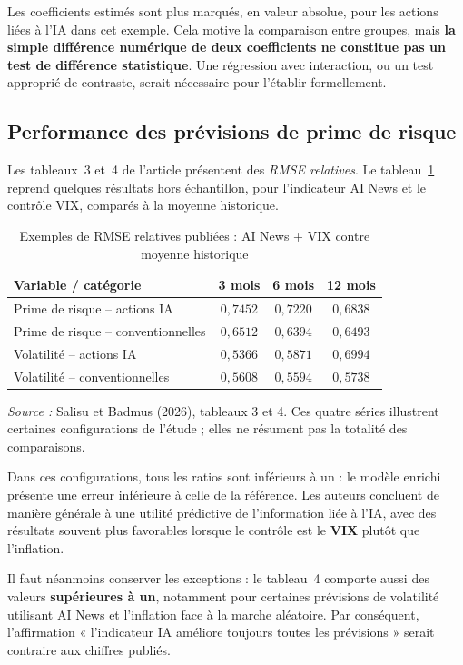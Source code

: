 \documentclass[11pt,a4paper]{article}
\begin{document}
Les coefficients estimés sont plus marqués, en valeur absolue, pour les actions liées à l'IA dans cet exemple. Cela motive la comparaison entre groupes, mais \textbf{la simple différence numérique de deux coefficients ne constitue pas un test de différence statistique}. Une régression avec interaction, ou un test approprié de contraste, serait nécessaire pour l'établir formellement.

\subsection{Performance des prévisions de prime de risque}
Les tableaux~3 et~4 de l'article présentent des \emph{RMSE relatives}. Le tableau~\ref{tab:forecast} reprend quelques résultats hors échantillon, pour l'indicateur AI News et le contrôle VIX, comparés à la moyenne historique.
\begin{table}[H]
\centering\small
\caption{Exemples de RMSE relatives publiées : AI News + VIX contre moyenne historique}
\label{tab:forecast}
\begin{tabularx}{\textwidth}{@{}Xccc@{}}
\toprule
\textbf{Variable / catégorie} & \textbf{3 mois} & \textbf{6 mois} & \textbf{12 mois}\\
\midrule
Prime de risque -- actions IA & $0{,}7452$ & $0{,}7220$ & $0{,}6838$\\
Prime de risque -- conventionnelles & $0{,}6512$ & $0{,}6394$ & $0{,}6493$\\
Volatilité -- actions IA & $0{,}5366$ & $0{,}5871$ & $0{,}6994$\\
Volatilité -- conventionnelles & $0{,}5608$ & $0{,}5594$ & $0{,}5738$\\
\bottomrule
\end{tabularx}
\vspace{0.1cm}
\parbox{\textwidth}{\footnotesize \emph{Source :} Salisu et Badmus (2026), tableaux 3 et 4. Ces quatre séries illustrent certaines configurations de l'étude ; elles ne résument pas la totalité des comparaisons.}
\end{table}

Dans ces configurations, tous les ratios sont inférieurs à un : le modèle enrichi présente une erreur inférieure à celle de la référence. Les auteurs concluent de manière générale à une utilité prédictive de l'information liée à l'IA, avec des résultats souvent plus favorables lorsque le contrôle est le \textbf{VIX} plutôt que l'inflation.

Il faut néanmoins conserver les exceptions : le tableau~4 comporte aussi des valeurs \textbf{supérieures à un}, notamment pour certaines prévisions de volatilité utilisant AI News et l'inflation face à la marche aléatoire. Par conséquent, l'affirmation « l'indicateur IA améliore toujours toutes les prévisions » serait contraire aux chiffres publiés.
\end{document}
